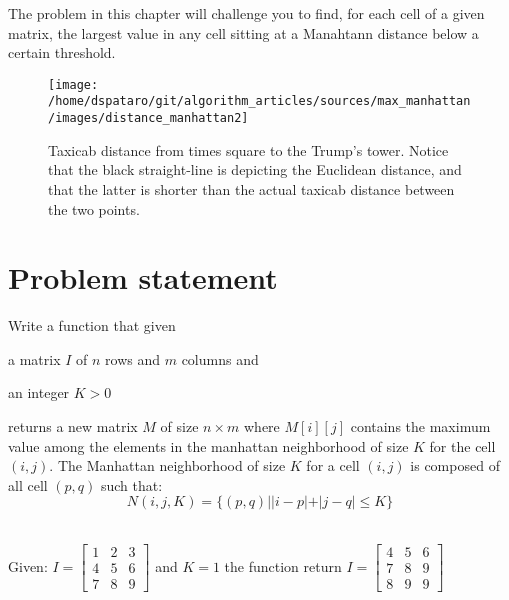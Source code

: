 The problem in this chapter will challenge you to find, for each cell of a given matrix, the largest
value in any cell sitting at a Manahtann distance below a certain threshold.

\begin{figure}
    \centering
    \texttt{[image: /home/dspataro/git/algorithm\_articles/sources/max\_manhattan/images/distance\_manhattan2]}
    \caption[Taxicab distance from times square to the trump tower]{Taxicab distance from times
    square to the Trump's tower. Notice that the black straight-line is depicting the Euclidean
    distance, and that the latter is shorter than the actual taxicab distance between  the two
    points.}
    \label{fig:max_manhattan:distance_manhattan}
\end{figure}

\section{Problem statement}
\begin{exercise}
\label{example:max_manhattan:exercice1}
Write a function that given \begin{enumerate*}
    \item a matrix $I$ of $n$ rows and $m$ columns and
    \item  an integer $K > 0$
\end{enumerate*}
returns a new matrix $M$ of size $n \times m$ where $M[i][j]$ contains the maximum value among the
elements in the manhattan neighborhood of size $K$ for the cell $(i,j)$. The Manhattan neighborhood
of size $K$ for a cell $(i,j)$ is composed of all cell $(p,q)$ such that:
\begin{equation}
    N(i,j, K) = \{(p,q) | |i-p|+|j-q| \leq K\}
    \label{eq:max_manhattan:neighbood_equation}
\end{equation}


\end{exercise}
    \begin{example}
        \label{example:max_manhattan:example1}
        \hfill \\
        Given: $I=
        \begin{bmatrix}
          1 & 2 & 3  \\
          4 & 5 & 6  \\
          7 & 8 & 9  
        \end{bmatrix}
      $
  and $K=1$ the function return $I=
  \begin{bmatrix}
      4 & 5 & 6  \\
      7 & 8 & 9  \\
      8 & 9 & 9  
    \end{bmatrix}
$
        
    \end{example}

